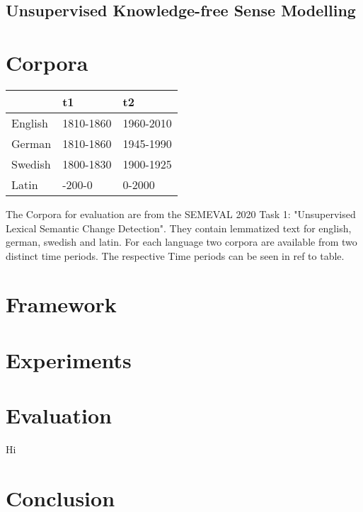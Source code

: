 \documentclass[11pt]{article}
\begin{document}
\subsection{Unsupervised Knowledge-free Sense Modelling}


\section{Corpora}

\begin{table}[h!]
  \label{corpora_epochs}
  \begin{tabular}{|l|l|l|}
  \hline
          & t1        & t2        \\ \hline
  English & 1810-1860 & 1960-2010 \\ \hline
  German  & 1810-1860 & 1945-1990 \\ \hline
  Swedish & 1800-1830 & 1900-1925 \\ \hline
  Latin   & -200-0    & 0-2000    \\ \hline
  \end{tabular}
\end{table}

The Corpora for evaluation are from the SEMEVAL 2020 Task 1: "Unsupervised Lexical Semantic Change Detection".
They contain lemmatized text for english, german, swedish and latin. For each language two corpora are available from two distinct time periods.
The respective Time periods can be seen in ref to table.

\section{Framework}

\section{Experiments}
\section{Evaluation} 
Hi
\section{Conclusion}



\end{document}
